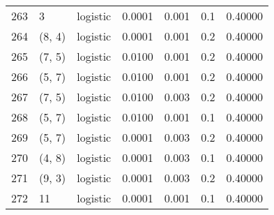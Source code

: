 \begin{tabular}{lllrrrr}
263 &           3 &  logistic &  0.0001 &  0.001 &  0.1 &   0.40000 \\
264 &      (8, 4) &  logistic &  0.0001 &  0.001 &  0.2 &   0.40000 \\
265 &      (7, 5) &  logistic &  0.0100 &  0.001 &  0.2 &   0.40000 \\
266 &      (5, 7) &  logistic &  0.0100 &  0.001 &  0.2 &   0.40000 \\
267 &      (7, 5) &  logistic &  0.0100 &  0.003 &  0.2 &   0.40000 \\
268 &      (5, 7) &  logistic &  0.0100 &  0.001 &  0.1 &   0.40000 \\
269 &      (5, 7) &  logistic &  0.0001 &  0.003 &  0.2 &   0.40000 \\
270 &      (4, 8) &  logistic &  0.0001 &  0.003 &  0.1 &   0.40000 \\
271 &      (9, 3) &  logistic &  0.0001 &  0.003 &  0.2 &   0.40000 \\
272 &          11 &  logistic &  0.0001 &  0.001 &  0.1 &   0.40000 \\
\bottomrule
\end{tabular}
